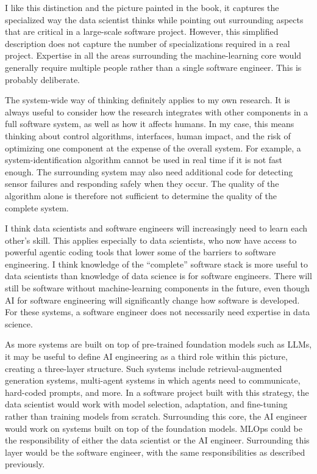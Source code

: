 \documentclass{article}
\begin{document}
I like this distinction and the picture painted in the book, it captures the specialized way the data scientist thinks while pointing out surrounding aspects that are critical in a large-scale software project. However, this simplified description does not capture the number of specializations required in a real project. Expertise in all the areas surrounding the machine-learning core would generally require multiple people rather than a single software engineer. This is probably deliberate.

The system-wide way of thinking definitely applies to my own research. It is always useful to consider how the research integrates with other components in a full software system, as well as how it affects humans. 
In my case, this means thinking about control algorithms, interfaces, human impact, and the risk of optimizing one component at the expense of the overall system. 
For example, a system-identification algorithm cannot be used in real time if it is not fast enough. 
The surrounding system may also need additional code for detecting sensor failures and responding safely when they occur. The quality of the algorithm alone is therefore not sufficient to determine the quality of the complete system.

I think data scientists and software engineers will increasingly need to learn each other's skill. This applies especially to data scientists, who now have access to powerful agentic coding tools that lower some of the barriers to software engineering. I think knowledge of the \enquote{complete} software stack is more useful to data scientists than knowledge of data science is for software engineers. There will still be software without machine-learning components in the future, even though AI for software engineering will significantly change how software is developed. For these systems, a software engineer does not necessarily need expertise in data science.

As more systems are built on top of pre-trained foundation models such as LLMs, it may be useful to define AI engineering as a third role within this picture, creating a three-layer structure. Such systems include retrieval-augmented generation systems, multi-agent systems in which agents need to communicate, hard-coded prompts, and more.
In a software project built with this strategy, the data scientist would work with model selection, adaptation, and fine-tuning rather than training models from scratch. Surrounding this core, the AI engineer would work on systems built on top of the foundation models. MLOps could be the responsibility of either the data scientist or the AI engineer. Surrounding this layer would be the software engineer, with the same responsibilities as described previously.
\end{document}
